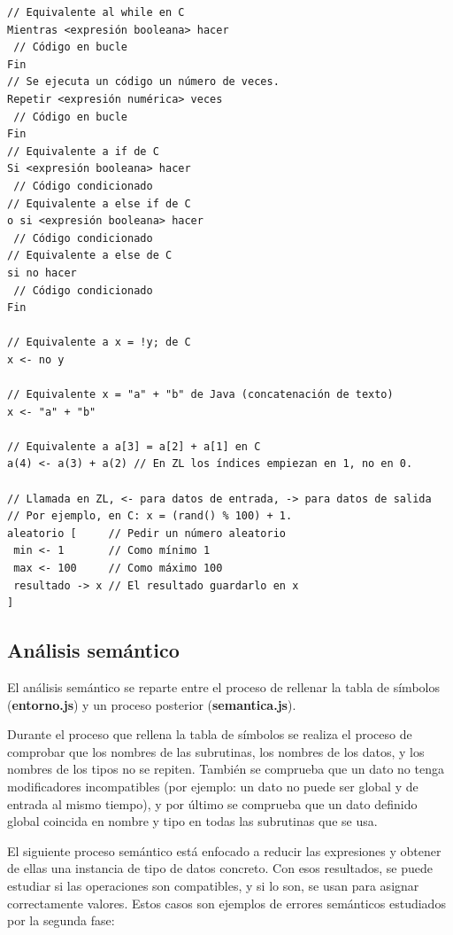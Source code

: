 \documentclass{report}
\begin{document}
	\begin{BVerbatim}
// Equivalente al while en C
Mientras <expresión booleana> hacer
 // Código en bucle
Fin
// Se ejecuta un código un número de veces. 
Repetir <expresión numérica> veces
 // Código en bucle
Fin
// Equivalente a if de C
Si <expresión booleana> hacer
 // Código condicionado
// Equivalente a else if de C
o si <expresión booleana> hacer
 // Código condicionado
// Equivalente a else de C
si no hacer
 // Código condicionado
Fin

// Equivalente a x = !y; de C
x <- no y

// Equivalente x = "a" + "b" de Java (concatenación de texto)
x <- "a" + "b"

// Equivalente a a[3] = a[2] + a[1] en C
a(4) <- a(3) + a(2) // En ZL los índices empiezan en 1, no en 0.

// Llamada en ZL, <- para datos de entrada, -> para datos de salida
// Por ejemplo, en C: x = (rand() % 100) + 1.
aleatorio [     // Pedir un número aleatorio
 min <- 1       // Como mínimo 1
 max <- 100     // Como máximo 100
 resultado -> x // El resultado guardarlo en x
]
	\end{BVerbatim}
	
	\subsection{Análisis semántico}
	
	El análisis semántico se reparte entre el proceso de rellenar la tabla de símbolos (\textbf{entorno.js}) y un proceso posterior (\textbf{semantica.js}). 
	
	\vspace{10px}
	
	Durante el proceso que rellena la tabla de símbolos se realiza el proceso de comprobar que los nombres de las subrutinas, los nombres de los datos, y los nombres de los tipos no se repiten. También se comprueba que un dato no tenga modificadores incompatibles (por ejemplo: un dato no puede ser global y de entrada al mismo tiempo), y por último se comprueba que un dato definido global coincida en nombre y tipo en todas las subrutinas que se usa.
	
	\vspace{10px}
	
	El siguiente proceso semántico está enfocado a reducir las expresiones y obtener de ellas una instancia de tipo de datos concreto. Con esos resultados, se puede estudiar si las operaciones son compatibles, y si lo son, se usan para asignar correctamente valores. Estos casos son ejemplos de errores semánticos estudiados por la segunda fase:
	
\end{document}
